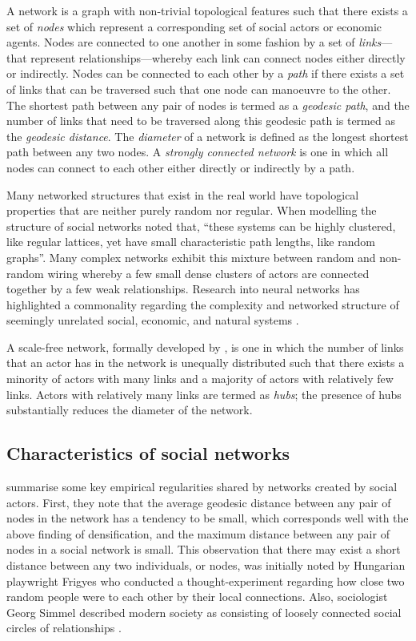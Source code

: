 A network is a graph with non-trivial topological features such that there exists a set of \emph{nodes} which represent a corresponding set of social actors or economic agents. Nodes are connected to one another in some fashion by a set of \emph{links}---that represent relationships---whereby each link can connect nodes either directly or indirectly. Nodes can be connected to each other by a \emph{path} if there exists a set of links that can be traversed such that one node can manoeuvre to the other. The shortest path between any pair of nodes is termed as a \emph{geodesic path}, and the number of links that need to be traversed along this geodesic path is termed as the \emph{geodesic distance}. The \emph{diameter} of a network is defined as the longest shortest path between any two nodes. A \emph{strongly connected network} is one in which all nodes can connect to each other either directly or indirectly by a path.

Many networked structures that exist in the real world have topological properties that are neither purely random nor regular. When modelling the structure of social networks \citet[p.~440]{WattsStrogatz1998} noted that, ``these systems can be highly clustered, like regular lattices, yet have small characteristic path lengths, like random graphs''. Many complex networks exhibit this mixture between random and non-random wiring whereby a few small dense clusters of actors are connected together by a few weak relationships. Research into neural networks has highlighted a commonality regarding the complexity and networked structure of seemingly unrelated social, economic, and natural systems \citep{SpornsTononi2005, Sporns2010}.

A scale-free network, formally developed by \citet{BarabasiAlbert1999}, is one in which the number of links that an actor has in the network is unequally distributed such that there exists a minority of actors with many links and a majority of actors with relatively few links. Actors with relatively many links are termed as \emph{hubs}; the presence of hubs substantially reduces the diameter of the network.

\subsection{Characteristics of social networks}

\citet{JacksonRogers2007} summarise some key empirical regularities shared by networks created by social actors. First, they note that the average geodesic distance between any pair of nodes in the network has a tendency to be small, which corresponds well with the above finding of densification, and the maximum distance between any pair of nodes in a social network is small. This observation that there may exist a short distance between any two individuals, or nodes, was initially noted by Hungarian playwright Frigyes \citet{Karinthy1929} who conducted a thought-experiment regarding how close two random people were to each other by their local connections. Also, sociologist Georg Simmel described modern society as consisting of loosely connected social circles of relationships \citep{Simmel1950}.

